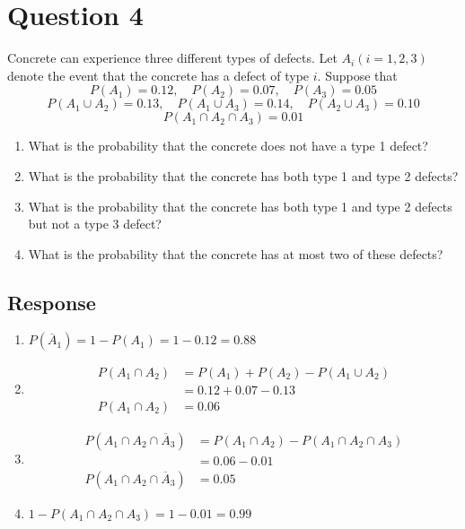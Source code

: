 \documentclass[13pt]{article}
\begin{document}
\newpage
\section*{Question 4}
Concrete can experience three different types of defects. Let $A_i (i
= 1, 2, 3)$ denote the event that the concrete has a defect of type
$i$. Suppose that
\[P(A_1) = 0.12, \hspace{1em} P(A_2) = 0.07, \hspace{1em} P(A_3) =
  0.05\]
\[P(A_1 \cup A_2) = 0.13, \hspace{1em} P(A_1 \cup A_3) = 0.14,
  \hspace{1em} P(A_2 \cup A_3) = 0.10\]
\[P(A_1 \cap A_2 \cap A_3) = 0.01\]
\begin{enumerate}[label=\textbf{\alph*.}]
\item What is the probability that the concrete does not have a type 1
  defect?
\item What is the probability that the concrete has both type 1 and
  type 2 defects?
\item What is the probability that the concrete has both type 1 and
  type 2 defects but not a type 3 defect?
\item What is the probability that the concrete has at most two of
  these defects?
\end{enumerate}

\subsection*{Response}
\begin{enumerate}[label=\textbf{\alph*.}]
\item $P(\overline{A}_1) = 1 - P(A_1) = 1 - 0.12 = 0.88$

\item
  \begin{align*}
    P(A_1 \cap A_2) &= P(A_1) + P(A_2) - P(A_1 \cup A_2) \\
                    &= 0.12 + 0.07 - 0.13 \\
    P(A_1 \cap A_2) &= 0.06
  \end{align*}

\item
  \begin{align*}
    P(A_1 \cap A_2 \cap \overline{A}_3) &= P(A_1 \cap A_2) - P(A_1
                                          \cap A_2 \cap A_3) \\
                    &= 0.06 - 0.01 \\
    P(A_1 \cap A_2 \cap \overline{A}_3) &= 0.05
  \end{align*}

\item $1 - P(A_1 \cap A_2 \cap A_3) = 1 - 0.01 = 0.99$
\end{enumerate}
\end{document}

